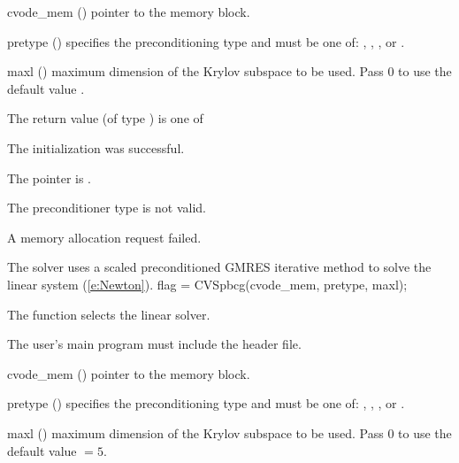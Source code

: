 {
  \begin{args}
  \item[cvode\_mem] ()
    pointer to the {\cvodes} memory block.
  \item[pretype] ()
    specifies the preconditioning type and must be one of: 
    , , , or .
  \item[maxl] ()
    maximum dimension of the Krylov subspace to be used. Pass $0$ to use the 
    default value .
  \end{args}
}
{
  The return value  (of type ) is one of
  \begin{args}
  \item[\Id{CVSPILS\_SUCCESS}] 
    The {\cvspgmr} initialization was successful.
  \item[\Id{CVSPILS\_MEM\_NULL}]
    The  pointer is .
  \item[\Id{CVSPILS\_ILL\_INPUT}]
    The preconditioner type  is not valid.
  \item[\Id{CVSPILS\_MEM\_FAIL}]
    A memory allocation request failed.
  \end{args}
}
{
  The {\cvspgmr} solver uses a scaled preconditioned GMRES
  iterative method to solve the linear system (\ref{e:Newton}).
}
{
  flag = CVSpbcg(cvode\_mem, pretype, maxl);
}
{
  The function  selects the {\cvspbcg} linear solver. 

  The user's main program must include the  header file.
}
{
  \begin{args}
  \item[cvode\_mem] ()
    pointer to the {\cvodes} memory block.
  \item[pretype] ()
    specifies the preconditioning type and must be one of: 
    , , , or .
  \item[maxl] ()
    maximum dimension of the Krylov subspace to be used. Pass $0$ to use the 
    default value  $= 5$.
  \end{args}
}
